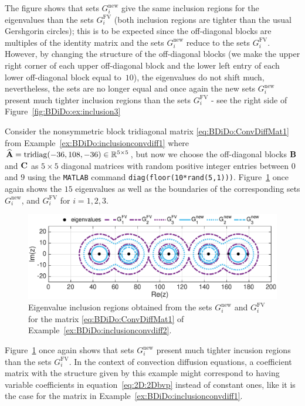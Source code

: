 \begin{example}
{The figure shows that  sets $G_i^{\text{new}}$ give the same inclusion regions
for the eigenvalues than the sets $G_i^{\text{FV}}$ (both inclusion regions are tighter than the usual Gershgorin circles); this is to be expected since the off-diagonal blocks are multiples of the identity matrix and the sets $G_i^{\text{new}}$ reduce to the sets $G_i^{\text{FV}}$. However, by changing the structure of the
off-diagonal blocks (we make the upper right corner of each upper off-diagonal block and the lower left entry of each lower off-diagonal block equal to~$10$), the eigenvalues do not shift much, nevertheless, the sets are no longer equal and once again the new sets $G_i^{\text{new}}$ present much tighter inclusion regions than the sets $G_i^{\text{FV}}$ - see the right side of \textnormal{Figure~\ref{fig:BDiDo:ex:inclusion3}}
}\end{example}

\begin{example}\label{ex:BDiDo:inclusionconvdiff2}{\textrm
Consider the  nonsymmetric block tridiagonal matrix \eqref{eq:BDiDo:ConvDiffMat1} from \textnormal{Example~\ref{ex:BDiDo:inclusionconvdiff1}}
where $\widehat{\mathbf{A}}=\mathrm{tridiag}(-36,108,-36)\in\mathbb{R}^{5\times5}$, but now we choose the off-diagonal blocks $\mathbf{B}$ and $\mathbf{C}$ as $5\times5$ diagonal matrices with random positive integer entries between $0$ and $9$ using the \textnormal{\texttt{MATLAB}} command \textnormal{\texttt{diag(floor(10*rand(5,1)))}}. \textnormal{Figure~\ref{fig:BDiDo:ex:inclusion4}} once again
shows the $15$ eigenvalues as well as the boundaries of the corresponding sets $G_i^{\text{new}}$, and $G_i^{\text{FV}}$ for $i=1,2,3$.
%
\begin{figure}[tbph]
\centering
\vspace*{-0.5cm}
\includegraphics[width=0.9\linewidth]{figures/Example417}
\vspace*{-0.7cm}
\caption{Eigenvalue inclusion regions obtained from the sets
$G_i^{\text{new}}$ and $G_i^{\text{FV}}$ for the matrix \eqref{eq:BDiDo:ConvDiffMat1} of Example~\ref{ex:BDiDo:inclusionconvdiff2}.}
\label{fig:BDiDo:ex:inclusion4}
\end{figure}

\textnormal{Figure~\ref{fig:BDiDo:ex:inclusion4}} once again shows that sets $G_i^{\text{new}}$ present much tighter incusion regions than the sets $G_i^{\text{FV}}$.
In the context of convection diffusion equations, a coefficient matrix with the structure given by this example might correspond to having variable coefficients in equation~\eqref{eq:2D:2Dbvp} instead of constant ones, like it is the case for the matrix in Example~\ref{ex:BDiDo:inclusionconvdiff1}.
}\end{example}



